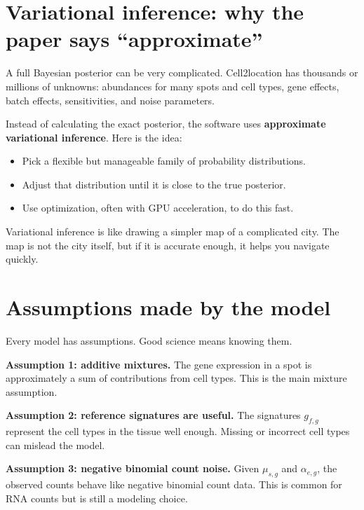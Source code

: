 \documentclass[11pt]{article}
\newcommand{\term}[1]{\textbf{#1}}
\begin{document}
\section{Variational inference: why the paper says ``approximate''}

A full Bayesian posterior can be very complicated. Cell2location has thousands or millions of unknowns: abundances for many spots and cell types, gene effects, batch effects, sensitivities, and noise parameters.

Instead of calculating the exact posterior, the software uses \term{approximate variational inference}. Here is the idea:

\begin{itemize}
  \item Pick a flexible but manageable family of probability distributions.
  \item Adjust that distribution until it is close to the true posterior.
  \item Use optimization, often with GPU acceleration, to do this fast.
\end{itemize}

\begin{bigidea}
Variational inference is like drawing a simpler map of a complicated city. The map is not the city itself, but if it is accurate enough, it helps you navigate quickly.
\end{bigidea}

\section{Assumptions made by the model}

Every model has assumptions. Good science means knowing them.

\begin{assumptionbox}
\term{Assumption 1: additive mixtures.} The gene expression in a spot is approximately a sum of contributions from cell types. This is the main mixture assumption.
\end{assumptionbox}

\begin{assumptionbox}
\term{Assumption 2: reference signatures are useful.} The signatures $g_{f,g}$ represent the cell types in the tissue well enough. Missing or incorrect cell types can mislead the model.
\end{assumptionbox}

\begin{assumptionbox}
\term{Assumption 3: negative binomial count noise.} Given $\mu_{s,g}$ and $\alpha_{e,g}$, the observed counts behave like negative binomial count data. This is common for RNA counts but is still a modeling choice.
\end{assumptionbox}
\end{document}
